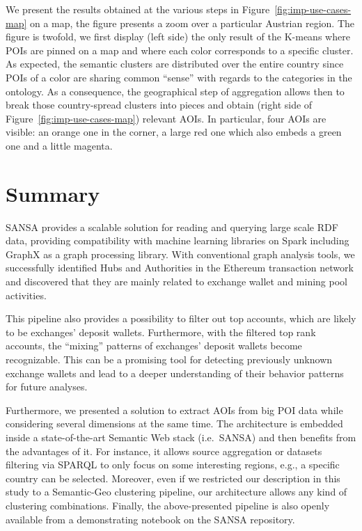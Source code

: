 We present the results obtained at the various steps in Figure~\ref{fig:imp-use-cases-map} on a map, the figure presents a zoom over a particular Austrian region. The figure is twofold, we first display (left side) the only result of the K-means where \gls{POI}s are pinned on a map and where each color corresponds to a specific cluster. As expected, the semantic clusters are distributed over the entire country since \gls{POI}s of a color are sharing common ``sense'' with regards to the categories in the ontology. As a consequence, the geographical step of aggregation allows then to break those country-spread clusters into pieces and obtain (right side of Figure~\ref{fig:imp-use-cases-map}) relevant \gls{AOI}s. In particular, four \gls{AOI}s are visible: an orange one in the corner, a large red one which also embeds a green one and a little magenta.


\section{Summary}
SANSA provides a scalable solution for reading and querying large scale \gls{RDF} data, providing compatibility with machine learning libraries on Spark including GraphX as a graph processing library.
With conventional graph analysis tools, we successfully identified Hubs and Authorities in the Ethereum transaction network and discovered that they are mainly related to exchange wallet and mining pool activities.

This pipeline also provides a possibility to filter out top accounts, which are likely to be exchanges' deposit wallets. 
Furthermore, with the filtered top rank accounts, the ``mixing'' patterns of exchanges' deposit wallets become recognizable. 
This can be a promising tool for detecting previously unknown exchange wallets and lead to a deeper understanding of their behavior patterns for future analyses.

Furthermore, we presented a solution to extract \gls{AOI}s from big POI data while considering several dimensions at the same time. The architecture is embedded inside a state-of-the-art Semantic Web stack (i.e.~SANSA) and then benefits from the advantages of it. For instance, it allows source aggregation or datasets filtering via \gls{SPARQL} to only focus on some interesting regions, e.g., a specific country can be selected. 
Moreover, even if we restricted our description in this study to a Semantic-Geo clustering pipeline, our architecture allows any kind of clustering combinations.
Finally, the above-presented pipeline is also openly available from a demonstrating notebook on the SANSA repository.

